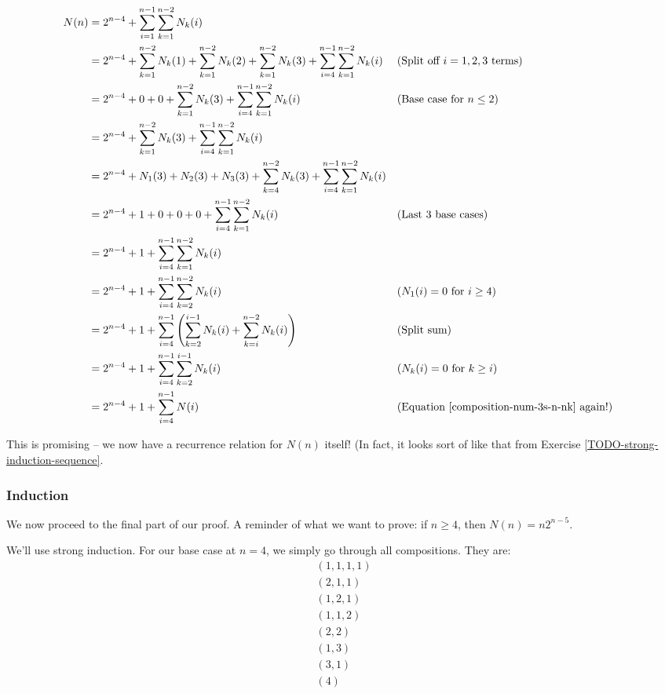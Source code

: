 \begin{align*}
N(n) &= 2^{n-4} + \sum_{i=1}^{n-1} \sum_{k=1}^{n-2} N_{k}(i) \\
&= 2^{n-4} + \sum_{k=1}^{n-2} N_{k}(1) + \sum_{k=1}^{n-2} N_{k}(2) + \sum_{k=1}^{n-2} N_{k}(3) + \sum_{i=4}^{n-1} \sum_{k=1}^{n-2} N_{k}(i) && \text{(Split off $i = 1,2,3$ terms)} \\
&= 2^{n-4} + 0 + 0 + \sum_{k=1}^{n-2} N_{k}(3) + \sum_{i=4}^{n-1} \sum_{k=1}^{n-2} N_{k}(i) && \text{(Base case for $n \leq 2$)} \\
&= 2^{n-4} + \sum_{k=1}^{n-2} N_{k}(3) + \sum_{i=4}^{n-1} \sum_{k=1}^{n-2} N_{k}(i) \\
&= 2^{n-4} + N_1(3) + N_2(3) + N_3(3) + \sum_{k=4}^{n-2} N_{k}(3) + \sum_{i=4}^{n-1} \sum_{k=1}^{n-2} N_{k}(i) \\
&= 2^{n-4} + 1 + 0 + 0 + 0 + \sum_{i=4}^{n-1} \sum_{k=1}^{n-2} N_{k}(i) && \text{(Last 3 base cases)} \\
&= 2^{n-4} + 1 + \sum_{i=4}^{n-1} \sum_{k=1}^{n-2} N_{k}(i) \\
&= 2^{n-4} + 1 + \sum_{i=4}^{n-1} \sum_{k=2}^{n-2} N_{k}(i) && \text{($N_1(i) = 0$ for  $i \geq 4$)} \\
&= 2^{n-4} + 1 + \sum_{i=4}^{n-1} \left( \sum_{k=2}^{i-1} N_{k}(i) + \sum_{k=i}^{n-2} N_{k}(i) \right) && \text{(Split sum)} \\
&= 2^{n-4} + 1 + \sum_{i=4}^{n-1} \sum_{k=2}^{i-1} N_{k}(i) && \text{($N_{k}(i) = 0$ for  $k \geq i$)} \\
&= 2^{n-4} + 1 + \sum_{i=4}^{n-1} N(i) && \text{(Equation \ref{composition-num-3s-n-nk} again!)} \\
\end{align*}

This is promising -- we now have a recurrence relation for $N(n)$ itself! (In fact, it looks sort of like that from Exercise \ref{TODO-strong-induction-sequence}. 


\subsubsection{Induction}

We now proceed to the final part of our proof. A reminder of what we want to prove: if $n \geq 4$, then $N(n) = n2^{n-5}$.

We'll use strong induction. For our base case at $n = 4$, we simply go through all compositions. They are:
\begin{gather*}
(1, 1, 1, 1) \\
(2, 1, 1) \\
(1, 2, 1) \\
(1, 1, 2) \\
(2, 2) \\
(1, 3) \\
(3, 1) \\
(4)
\end{gather*}

